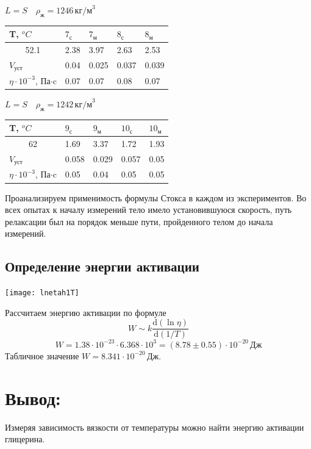 \documentclass[a4paper,12pt]{article}
\newcommand{\dif}{\mathrm{d}}
\begin{document}
		\begin{center}
			$L = S \quad \rho_{\text{ж}} = 1246 \, \text{кг/м}^3$
			
			\begin{tabular}{l  l  l  l  l}
				T, $^oC$ & $7_{\text{с}}$ & $7_{\text{м}}$ & $8_{\text{с}}$ & $8_{\text{м}}$ \\ \hline
				\multicolumn{1}{|c|}{52.1} & 2.38  & 3.97 & 2.63 & 2.53 \\ \hline 
				$V_{\text{уст}}$ & 0.04 & 0.025 & 0.037 & 0.039 \\ \hline
				$\eta \cdot 10^{-3}$, Па$\cdot$c &  0.07 & 0.07 & 0.08 & 0.07 \\ \hline 
			\end{tabular}
		\end{center}
		
		\begin{center}
			$L = S \quad \rho_{\text{ж}} = 1242 \, \text{кг/м}^3$
			
			\begin{tabular}{l  l  l  l  l}
				T, $^oC$ & $9_{\text{с}}$ & $9_{\text{м}}$ & $10_{\text{с}}$ & $10_{\text{м}}$ \\ \hline
				\multicolumn{1}{|c|}{62} & 1.69  & 3.37 & 1.72 & 1.93 \\ \hline 
				$V_{\text{уст}}$ &  0.058 &  0.029 & 0.057 & 0.05 \\ \hline
				$\eta \cdot 10^{-3}$, Па$\cdot$c &  0.05 & 0.04 & 0.05 & 0.05 \\ \hline 
			\end{tabular}
		\end{center}
		
		Проанализируем применимость формулы Стокса в каждом из экспериментов. Во всех опытах к началу измерений тело имело установившуюся скорость, путь релаксации был на порядок меньше пути, пройденного телом до начала измерений.
		
		\subsection{Определение энергии активации}
		\texttt{[image: lnetah1T]}
		
		Рассчитаем энергию активации по формуле
		\begin{equation}
			W \sim k\frac{\dif\left(\ln\eta\right)}{\dif\left(1/T\right)}
		\end{equation}
		\[
		W = 1.38\cdot10^{-23}\cdot 6.368 \cdot 10^3 = \left(8.78\pm 0.55\right) \cdot 10^{-20}\, \text{Дж}
		\]
		Табличное значение $W = 8.341 \cdot 10^{-20}\,\text{Дж}$.
		
	
		
	\section{Вывод:}
		Измеряя зависимость вязкости от температуры можно найти энергию активации глицерина.
\end{document}
